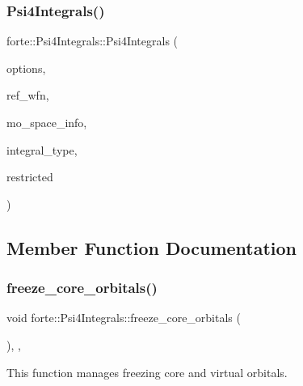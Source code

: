 \subsubsection{\texorpdfstring{Psi4\+Integrals()}{Psi4Integrals()}}
{\footnotesize\ttfamily forte\+::\+Psi4\+Integrals\+::\+Psi4\+Integrals (\begin{DoxyParamCaption}\item[{std\+::shared\+\_\+ptr$<$ \mbox{\hyperlink{classforte_1_1_forte_options}{Forte\+Options}} $>$}]{options,  }\item[{std\+::shared\+\_\+ptr$<$ psi\+::\+Wavefunction $>$}]{ref\+\_\+wfn,  }\item[{std\+::shared\+\_\+ptr$<$ \mbox{\hyperlink{classforte_1_1_m_o_space_info}{M\+O\+Space\+Info}} $>$}]{mo\+\_\+space\+\_\+info,  }\item[{\mbox{\hyperlink{namespaceforte_a790e7e85ac0911c4c9494622496d95e6}{Integral\+Type}}}]{integral\+\_\+type,  }\item[{\mbox{\hyperlink{namespaceforte_a7defa2660dd3eb07aa81176b90781be7}{Integral\+Spin\+Restriction}}}]{restricted }\end{DoxyParamCaption})}



\subsection{Member Function Documentation}
\mbox{\label{classforte_1_1_psi4_integrals_ae547d05a2ada31f05a5e3dc58c9630c3}} 
\subsubsection{\texorpdfstring{freeze\+\_\+core\+\_\+orbitals()}{freeze\_core\_orbitals()}}
{\footnotesize\ttfamily void forte\+::\+Psi4\+Integrals\+::freeze\+\_\+core\+\_\+orbitals (\begin{DoxyParamCaption}{ }\end{DoxyParamCaption})\hspace{0.3cm}{\ttfamily [override]}, {\ttfamily [protected]}, {\ttfamily [virtual]}}



This function manages freezing core and virtual orbitals. 



